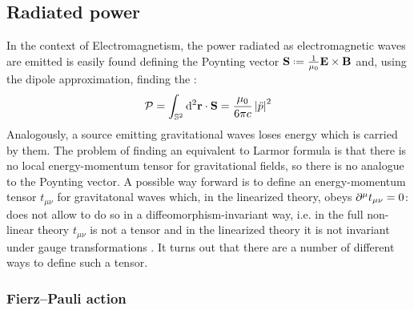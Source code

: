 \subsection{Radiated power}

In the context of Electromagnetism, the power radiated as electromagnetic waves are emitted is easily found defining the Poynting vector $ \ve{S} \defeq \frac{1}{\mu_0} \ve{E} \times \ve{B} $ and, using the dipole approximation, finding the :
\begin{equation*}
  \mathcal{P} = \int_{\mathbb{S}^{2}} \mathrm{d}^2\mathbf{r} \cdot \mathbf{S} = \frac{\mu_0}{6\pi c} \left\lvert\ddot{p}\right\rvert^2
\end{equation*}
Analogously, a source emitting gravitational waves loses energy which is carried by them. The problem of finding an equivalent to Larmor formula is that there is no local energy-momentum tensor for gravitational fields, so there is no analogue to the Poynting vector. A possible way forward is to define an energy-momentum tensor $ t_{\mu \nu} $ for gravitatonal waves which, in the linearized theory, obeys $ \partial^\mu t_{\mu \nu} = 0 $:  does not allow to do so in a diffeomorphism-invariant way, i.e. in the full non-linear theory $ t_{\mu \nu} $ is not a tensor and in the linearized theory it is not invariant under gauge transformations . It turns out that there are a number of different ways to define such a tensor.

\subsubsection{Fierz--Pauli action}

